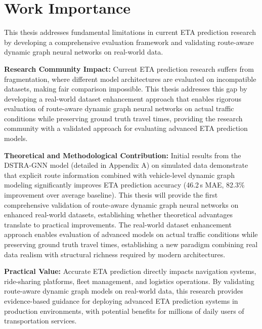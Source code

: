 \section{Work Importance}

This thesis addresses fundamental limitations in current ETA prediction research by developing a comprehensive evaluation framework and validating route-aware dynamic graph neural networks on real-world data.

\textbf{Research Community Impact:} Current ETA prediction research suffers from fragmentation, where different model architectures are evaluated on incompatible datasets, making fair comparison impossible. This thesis addresses this gap by developing a real-world dataset enhancement approach that enables rigorous evaluation of route-aware dynamic graph neural networks on actual traffic conditions while preserving ground truth travel times, providing the research community with a validated approach for evaluating advanced ETA prediction models.

\textbf{Theoretical and Methodological Contribution:} Initial results from the DSTRA-GNN model (detailed in Appendix A) on simulated data demonstrate that explicit route information combined with vehicle-level dynamic graph modeling significantly improves ETA prediction accuracy (46.2\,s MAE, 82.3\% improvement over average baseline). This thesis will provide the first comprehensive validation of route-aware dynamic graph neural networks on enhanced real-world datasets, establishing whether theoretical advantages translate to practical improvements. The real-world dataset enhancement approach enables evaluation of advanced models on actual traffic conditions while preserving ground truth travel times, establishing a new paradigm combining real data realism with structural richness required by modern architectures.

\textbf{Practical Value:} Accurate ETA prediction directly impacts navigation systems, ride-sharing platforms, fleet management, and logistics operations. By validating route-aware dynamic graph models on real-world data, this research provides evidence-based guidance for deploying advanced ETA prediction systems in production environments, with potential benefits for millions of daily users of transportation services.


